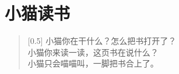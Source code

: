 \documentclass[12pt,UTF-8,openany]{ctexbook}
\begin{document}
\clearpage

\begin{center}
    
\end{center}


\hanzibox{}\hanzibox{}\hanzibox{}\hanzibox{}\hspace{1em}\hanzibox{}\hanzibox{}\hanzibox{}\hanzibox{}

\hanzibox{}\hanzibox{}\hanzibox{}\hanzibox{}\hspace{1em}\hanzibox{}\hanzibox{}\hanzibox{}\hanzibox{}

\hanzibox{}\hanzibox{}\hanzibox{}\hanzibox{}\hspace{1em}\hanzibox{}\hanzibox{}\hanzibox{}\hanzibox{}

\hanzibox{}\hanzibox{}\hanzibox{}\hanzibox{}\hspace{1em}\hanzibox{}\hanzibox{}\hanzibox{}\hanzibox{}






\chapter{小猫读书}

\begin{large}
    
    \begin{verse}[0.5\linewidth]
        小猫你在干什么？怎么把书打开了？ \\
        小猫你来读一读，这页书在说什么？ \\
        小猫只会喵喵叫，一脚把书合上了。
    \end{verse}
    
\end{large}


\clearpage

\begin{center}
    
    
    
\end{center}


\hanzibox{}\hanzibox{}\hanzibox{}\hanzibox{}\hspace{1em}\hanzibox{}\hanzibox{}\hanzibox{}\hanzibox{}
\end{document}
